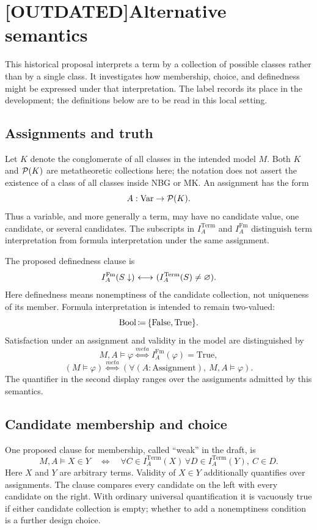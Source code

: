 \def\topic{Alternative Semantics}

\section{[OUTDATED]Alternative semantics}

This historical proposal interprets a term by a collection of possible
classes rather than by a single class. It investigates how membership,
choice, and definedness might be expressed under that interpretation.
The label records its place in the development; the definitions below are
to be read in this local setting.

\subsection{Assignments and truth}
Let $K$ denote the conglomerate of all classes in the intended model $M$.
Both $K$ and $\mathcal{P}(K)$ are metatheoretic collections here; the notation
does not assert the existence of a class of all classes inside NBG or MK.
An assignment has the form
\[A:\mbox{Var}\to \mathcal{P}(K).\]
Thus a variable, and more generally a term, may have no candidate value,
one candidate, or several candidates. The subscripts in
$I_A^{\mathrm{Term}}$ and $I_A^{\mathrm{Fm}}$ distinguish term interpretation
from formula interpretation under the same assignment.

The proposed definedness clause is
\[
I^{\mathrm{Fm}}_A(S\downarrow)
{\ \longleftrightarrow\ } (I^{\mathrm{Term}}_A(S)\neq\varnothing).
\]
Here definedness means nonemptiness of the candidate collection, not
uniqueness of its member. Formula interpretation is intended to remain
two-valued:
\[\mbox{Bool} \,{\coloneqq}\, \{\mbox{False}, \mbox{True}\}.\]
Satisfaction under an assignment and validity in the model are distinguished
by
\[
M,A\vDash \varphi \stackrel{meta}{\Longleftrightarrow}
I_A^{\mathrm{Fm}}(\varphi)=\mbox{True},
\]
\[
(M\vDash \varphi)
\stackrel{meta}{\Longleftrightarrow}
(\forall (A:\mbox{Assignment}),\ M,A\vDash \varphi).
\]
The quantifier in the second display ranges over the assignments admitted
by this semantics.

\subsection{Candidate membership and choice}
One proposed clause for membership, called ``weak'' in the draft, is
\[
M,A\vDash X\in Y
\quad\Longleftrightarrow\quad
\forall C\in I_A^{\mathrm{Term}}(X)\,
\forall D\in I_A^{\mathrm{Term}}(Y),\ C\in D.
\]
Here $X$ and $Y$ are arbitrary terms. Validity of $X\in Y$ additionally
quantifies over assignments. The clause compares every candidate on the
left with every candidate on the right. With ordinary universal
quantification it is vacuously true if either candidate collection is
empty; whether to add a nonemptiness condition is a further design choice.

